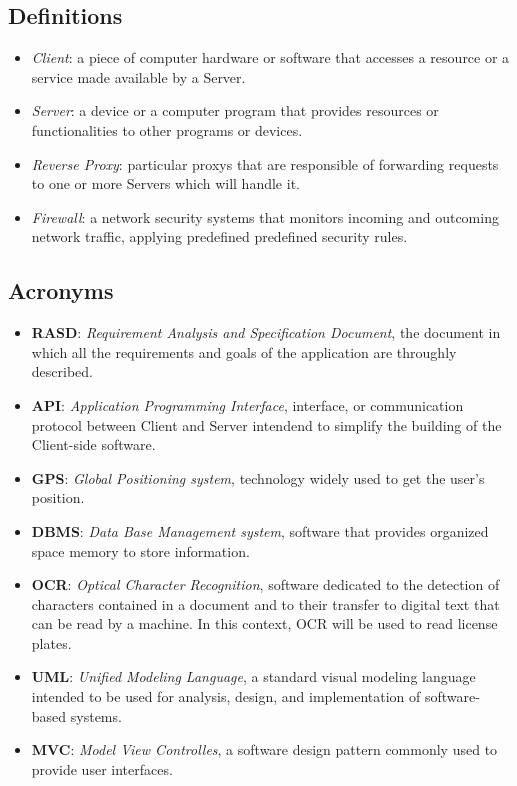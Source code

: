 \documentclass{report}
\begin{document}
\subsection{Definitions}
\begin{itemize}
    \item \textit{Client}: a piece of computer hardware or software that accesses a resource or a service made available by a Server.
    \item \textit{Server}: a device or a computer program that provides resources or functionalities to other programs or devices.
    \item \textit{Reverse Proxy}: particular proxys that are responsible of forwarding requests to one or more Servers which will handle it.
    \item \textit{Firewall}: a network security systems that monitors incoming and outcoming network traffic, applying predefined predefined security rules.
\end{itemize}
\subsection{Acronyms}
\begin{itemize}
    \item \textbf{RASD}: \textit{Requirement Analysis and Specification Document}, the document in which all the requirements and goals of the application are throughly described.
    \item \textbf{API}: \textit{Application Programming Interface}, interface, or communication protocol between Client and Server intendend to simplify the building of the Client-side software.
    \item \textbf{GPS}: \textit{Global Positioning system}, technology widely used to get the user's position.
    \item \textbf{DBMS}: \textit{Data Base Management system}, software that provides organized space memory to store information.
    \item \textbf{OCR}: \textit{Optical Character Recognition}, software dedicated to the detection of characters contained in a document and to their transfer to digital text that can be read by a machine. In this context, OCR will be used to read license plates.
    \item \textbf{UML}: \textit{Unified Modeling Language}, a standard visual modeling language intended to be used for analysis, design, and implementation of software-based systems.
    \item \textbf{MVC}: \textit{Model View Controlles}, a software design pattern commonly used to provide user interfaces.
    \end{itemize}
\end{document}
